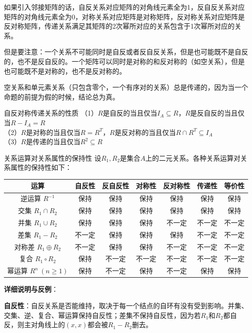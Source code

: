 \documentclass[lang=cn,11pt]{elegantbook}
\begin{document}
如果引入邻接矩阵的话，自反关系对应矩阵的对角线元素全为1，反自反关系对应矩阵的对角线元素全为0，对称关系对应矩阵是对称矩阵，反对称关系对应矩阵是反对称矩阵，传递关系满足其矩阵的2次幂所对应的关系包含于1次幂所对应的关系。

但是要注意：一个关系不可能同时是自反或者反自反关系，但是也可能既不是自反的，也不是反自反的。一个矩阵可以同时是对称的和反对称的（如空关系），但是也可能既不是对称的，也不是反对称的。

空关系和单元素关系（只包含零个，一个有序对的关系）总是传递的，因为当一个命题的前提为假的时候，结论总为真。
\begin{theorem}{自反对称传递关系的性质}
（1）$R$是自反的当且仅当$I_A\subseteq R$，$R$是反自反的当且仅当$R-I_A=R$\\
（2）$R$是对称的当且仅当$R=R^T$，$R$是反对称的当且仅当$R\cap R^T\subseteq I_A$\\
（3）$R$是传递的当且仅当$R^2\subseteq R$
\end{theorem}
\begin{theorem}{关系运算对关系属性的保持性}
设$R_1, R_2$是集合$A$上的二元关系。各种关系运算对关系属性的保持性如下：
\begin{center}
\begin{tabular}{|c|c|c|c|c|c|c|}
\hline
运算 & 自反性 & 反自反性 & 对称性 & 反对称性 & 传递性 & 等价性 \\
\hline
逆运算 $R^{-1}$ & 保持 & 保持 & 保持 & 保持 & 保持 & 保持 \\
\hline
交集 $R_1 \cap R_2$ & 保持 & 保持 & 保持 & 保持 & 保持 & 保持 \\
\hline
并集 $R_1 \cup R_2$ & 保持 & 保持 & 保持 & 不一定 & 不一定 & 不一定 \\
\hline
差集 $R_1 - R_2$ & 不一定 & 保持 & 保持 & 保持 & 不一定 & 不一定 \\
\hline
对称差 $R_1 \oplus R_2$ & 不一定 & 保持 & 保持 & 不一定 & 不一定 & 不一定 \\
\hline
复合 $R_1 \circ R_2$ & 保持 & 不一定 & 不一定 & 不一定 & 不一定 & 不一定 \\
\hline
幂运算 $R^n~(n\geqslant1)$ & 保持 & 不一定 & 保持 & 不一定 & 保持 & 保持 \\
\hline
\end{tabular}
\end{center}
\end{theorem}
\textbf{详细说明与反例}：

\textbf{自反性}：自反关系是否能维持，取决于每一个结点的自环有没有受到影响。并集、交集、逆、复合、幂运算保持自反性；差集不保持自反性，因为若$R_1$和$R_2$都自反，则主对角线上的$(x,x)$都会被$R_1-R_2$删去。
\end{document}
